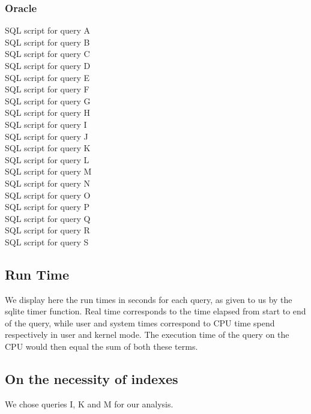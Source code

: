 \documentclass{article}
\begin{document}
\subsubsection*{Oracle}
{SQL script for query A} \\
{SQL script for query B} \\
{SQL script for query C} \\
{SQL script for query D} \\
{SQL script for query E} \\
{SQL script for query F} \\
{SQL script for query G} \\
{SQL script for query H} \\
{SQL script for query I} \\
{SQL script for query J} \\
{SQL script for query K} \\
{SQL script for query L} \\
{SQL script for query M} \\
{SQL script for query N} \\
{SQL script for query O} \\
{SQL script for query P} \\
{SQL script for query Q} \\
{SQL script for query R} \\
{SQL script for query S} \\

\subsection*{Run Time}
We display here the run times in seconds for each query, as given to us by the sqlite timer function. Real time corresponds to the time elapsed from start to end of the query, while user and system times correspond to CPU time spend respectively in user and kernel mode. The execution time of the query on the CPU would then equal the sum of both these terms.
\bigskip
\\
\subsection*{On the necessity of indexes}
We chose queries I, K and M for our analysis. 
\\
\end{document}
